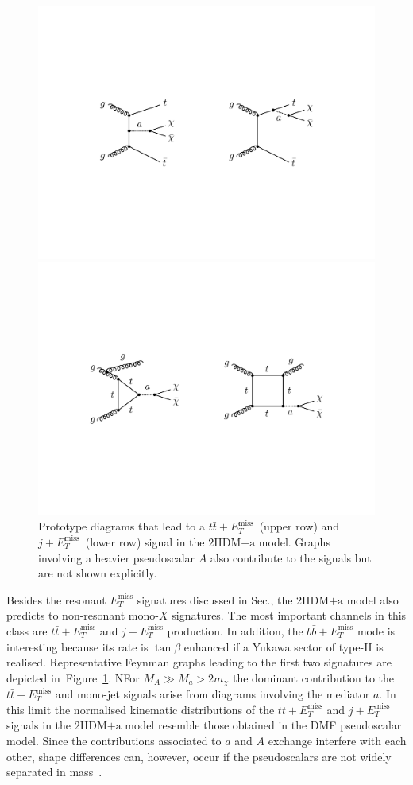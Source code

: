 \documentclass[a4paper, 11pt,notoc]{article}
\newcommand{\MET}{\ensuremath{E_T^\mathrm{miss}}\xspace}
\newcommand{\hdma}{\ensuremath{\textrm{2HDM+a}}\xspace}
\begin{document}
\begin{figure}[t!]
\centering
\includegraphics[width=.725\textwidth]{ttmet.pdf}

\vspace{7mm}

\includegraphics[width=.8\textwidth]{jmet.pdf}

\vspace{4mm}
\caption{\label{fig:nonresonant} Prototype diagrams that lead  to a $t \bar t+\MET$~(upper row) and $j+\MET$~(lower row) signal in the \hdma model. Graphs involving a heavier pseudoscalar $A$ also contribute to the signals but are not shown explicitly.}
\end{figure}

Besides the resonant $\MET$ signatures discussed in Sec.\label{sec:experimentbasics}, the   \hdma model also predicts to non-resonant mono-$X$ signatures. The most important channels in this class are $t \bar t +\MET$ and $j+\MET$ production. In addition, the $b \bar b +\MET$ mode is interesting because its rate is $\tan \beta$ enhanced if a Yukawa sector of  type-II is realised.  Representative Feynman graphs leading to the first two signatures are depicted in~Figure~\ref{fig:nonresonant}. NFor $M_A \gg M_a > 2 m_\chi$ the dominant contribution to the  $t \bar t +\MET$ and mono-jet signals arise from diagrams involving the  mediator $a$. In this limit the normalised kinematic distributions of the $t \bar t + \MET$ and $j+\MET$ signals in the \hdma model resemble those obtained in the DMF pseudoscalar   model. Since the contributions  associated to $a$ and $A$ exchange interfere with each other, shape differences can, however, occur if the pseudoscalars are not widely separated in mass~\cite{Bauer:2017ota}.
\end{document}

